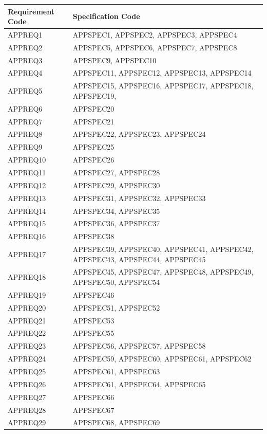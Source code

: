\documentclass[11pt,a4paper]{article}
\begin{document}
\begin{longtable}{|p{2.7cm}|p{10cm}|}
\hline
\textbf{Requirement Code} & \textbf{Specification Code} \\
\hline
{APPREQ1} &
{APPSPEC1, APPSPEC2, APPSPEC3, APPSPEC4}\\\hline
{APPREQ2} &
{APPSPEC5, APPSPEC6, APPSPEC7, APPSPEC8}\\\hline
{APPREQ3} &
{APPSPEC9, APPSPEC10}\\\hline
{APPREQ4} &
{APPSPEC11, APPSPEC12, APPSPEC13, APPSPEC14}\\\hline
{APPREQ5} &
{APPSPEC15, APPSPEC16, APPSPEC17, APPSPEC18, APPSPEC19, }\\\hline
{APPREQ6} &
{APPSPEC20}\\\hline
{APPREQ7} &
{APPSPEC21}\\\hline
{APPREQ8} &
{APPSPEC22, APPSPEC23, APPSPEC24}\\\hline
{APPREQ9} &
{APPSPEC25}\\\hline
{APPREQ10} &
{APPSPEC26}\\\hline
{APPREQ11} &
{APPSPEC27, APPSPEC28}\\\hline
{APPREQ12} &
{APPSPEC29, APPSPEC30}\\\hline
{APPREQ13} &
{APPSPEC31, APPSPEC32, APPSPEC33}\\\hline
{APPREQ14} &
{APPSPEC34, APPSPEC35}\\\hline
{APPREQ15} &
{APPSPEC36, APPSPEC37}\\\hline
{APPREQ16} &
{APPSPEC38}\\\hline
{APPREQ17} &
{APPSPEC39, APPSPEC40, APPSPEC41, APPSPEC42, APPSPEC43, APPSPEC44, APPSPEC45}\\\hline
{APPREQ18} &
{APPSPEC45, APPSPEC47, APPSPEC48, APPSPEC49, APPSPEC50, APPSPEC54}\\\hline
{APPREQ19} &
{APPSPEC46}\\\hline
{APPREQ20} &
{APPSPEC51, APPSPEC52}\\\hline
{APPREQ21} &
{APPSPEC53}\\\hline
{APPREQ22} &
{APPSPEC55}\\\hline
{APPREQ23} &
{APPSPEC56, APPSPEC57, APPSPEC58}\\\hline
{APPREQ24} &
{APPSPEC59, APPSPEC60, APPSPEC61, APPSPEC62}\\\hline
{APPREQ25} &
{APPSPEC61, APPSPEC63}\\\hline
{APPREQ26} &
{APPSPEC61, APPSPEC64, APPSPEC65}\\\hline
{APPREQ27} &
{APPSPEC66}\\\hline
{APPREQ28} &
{APPSPEC67}\\\hline
{APPREQ29} &
{APPSPEC68, APPSPEC69}\\\hline
\end{longtable}
\end{document}
